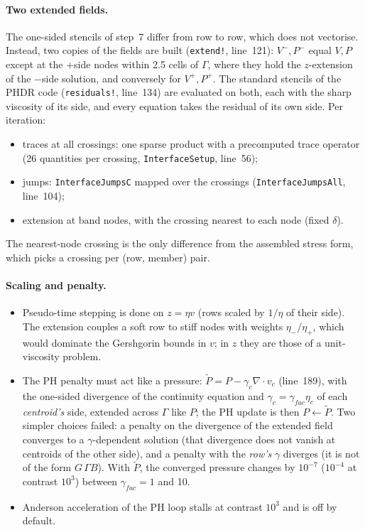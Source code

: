 \documentclass[11pt,a4paper]{article}
\newcommand{\code}[1]{\texttt{#1}}
\begin{document}
\paragraph{Two extended fields.} The one-sided stencils of step~7 differ from row to row, which
does not vectorise. Instead, two copies of the fields are built (\code{extend!}, line~121):
$V^-,P^-$ equal $V,P$ except at the $+$side nodes within 2.5 cells of $\Gamma$, where they hold
the $z$-extension of the $-$side solution, and conversely for $V^+,P^+$. The standard stencils
of the PHDR code (\code{residuals!}, line~134) are evaluated on both, each with the sharp
viscosity of its side, and every equation takes the residual of its own side. Per iteration:
\begin{itemize}
  \item traces at all crossings: one sparse product with a precomputed trace operator
    (26 quantities per crossing, \code{InterfaceSetup}, line~56);
  \item jumps: \code{InterfaceJumpsC} mapped over the crossings (\code{InterfaceJumpsAll},
    line~104);
  \item extension at band nodes, with the crossing nearest to each node (fixed $\delta$).
\end{itemize}
The nearest-node crossing is the only difference from the assembled stress form, which picks a
crossing per (row, member) pair.

\paragraph{Scaling and penalty.}
\begin{itemize}
  \item Pseudo-time stepping is done on $z=\eta v$ (rows scaled by $1/\eta$ of their side). The
    extension couples a soft row to stiff nodes with weights $\eta_-/\eta_+$, which would
    dominate the Gershgorin bounds in $v$; in $z$ they are those of a unit-viscosity problem.
  \item The PH penalty must act like a pressure: $\tilde P=P-\gamma_c\nabla\cdot v_c$ (line~189),
    with the one-sided divergence of the continuity equation and $\gamma_c=\gamma_{fac}\eta_c$
    of each \emph{centroid's} side, extended across $\Gamma$ like $P$; the PH update is then
    $P\leftarrow\tilde P$. Two simpler choices failed: a penalty on the divergence of the
    extended field converges to a $\gamma$-dependent solution (that divergence does not vanish
    at centroids of the other side), and a penalty with the \emph{row's} $\gamma$ diverges (it
    is not of the form $G\,\Gamma B$). With $\tilde P$, the converged pressure changes by
    $10^{-7}$ ($10^{-4}$ at contrast $10^3$) between $\gamma_{fac}=1$ and 10.
  \item Anderson acceleration of the PH loop stalls at contrast $10^3$ and is off by default.
\end{itemize}
\end{document}
